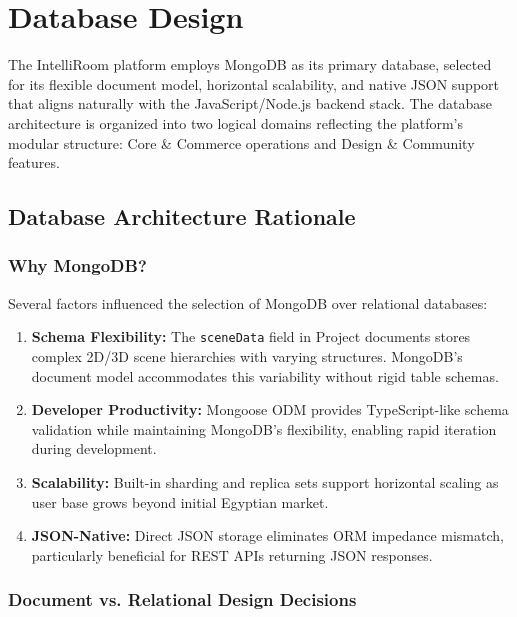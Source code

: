 \section{Database Design}
\label{sec:database}

The IntelliRoom platform employs MongoDB as its primary database, selected for its flexible document model, horizontal scalability, and native JSON support that aligns naturally with the JavaScript/Node.js backend stack. The database architecture is organized into two logical domains reflecting the platform's modular structure: Core \& Commerce operations and Design \& Community features.

\subsection{Database Architecture Rationale}

\subsubsection{Why MongoDB?}

Several factors influenced the selection of MongoDB over relational databases:

\begin{enumerate}
    \item \textbf{Schema Flexibility:} The \texttt{sceneData} field in Project documents stores complex 2D/3D scene hierarchies with varying structures. MongoDB's document model accommodates this variability without rigid table schemas.
    
    \item \textbf{Developer Productivity:} Mongoose ODM provides TypeScript-like schema validation while maintaining MongoDB's flexibility, enabling rapid iteration during development.
    
    \item \textbf{Scalability:} Built-in sharding and replica sets support horizontal scaling as user base grows beyond initial Egyptian market.
    
    \item \textbf{JSON-Native:} Direct JSON storage eliminates ORM impedance mismatch, particularly beneficial for REST APIs returning JSON responses.
\end{enumerate}

\subsubsection{Document vs. Relational Design Decisions}

